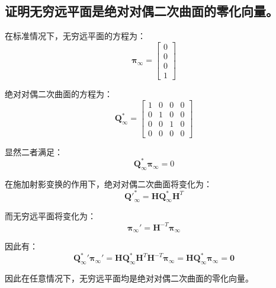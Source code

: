 \documentclass[11pt]{article}
\begin{document}
\subsection{证明无穷远平面是绝对对偶二次曲面的零化向量。}
在标准情况下，无穷远平面的方程为：
\begin{equation*}
  \mathbold{\pi}_\infty=\begin{bmatrix}
    0 \\0\\0\\1
  \end{bmatrix}
\end{equation*}\par
绝对对偶二次曲面的方程为：
\begin{equation*}
  \mathbold{Q}^*_\infty=\begin{bmatrix}
    1 & 0 & 0 & 0 \\
    0 & 1 & 0 & 0 \\
    0 & 0 & 1 & 0 \\
    0 & 0 & 0 & 0
  \end{bmatrix}
\end{equation*}\par
显然二者满足：
\begin{equation*}
  \mathbold{Q}^*_\infty\mathbold{\pi}_\infty=0
\end{equation*}\par
在施加射影变换的作用下，绝对对偶二次曲面将变化为：
\begin{equation*}
  {\mathbf{Q'}^*_\infty}=\mathbold{H}\mathbold{Q}^*_\infty\mathbold{H}^T
\end{equation*}\par
而无穷远平面将变化为：
\begin{equation*}
  \mathbold{\pi}_\infty'=\mathbold{H}^{-T}\mathbold{\pi}_\infty
\end{equation*}\par
因此有：
\begin{equation*}
  {\mathbold{Q}^*_\infty}'{\mathbold{\pi}_\infty}'=\mathbold{H}\mathbold{Q}^*_\infty\mathbold{H}^T\mathbold{H}^{-T}\mathbold{\pi}_\infty=\mathbold{H}\mathbold{Q}^*_\infty\mathbold{\pi}_\infty=\mathbold{0}
\end{equation*}\par
因此在任意情况下，无穷远平面均是绝对对偶二次曲面的零化向量。
\end{document}
